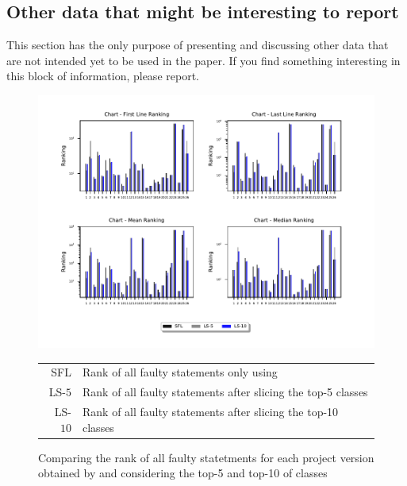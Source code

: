 \documentclass{article}
\begin{document}
\begin{appendices}
	\section{Other data that might be interesting to report}
	This section has the only purpose of presenting and discussing other data that 
	are not intended yet to be used in the paper. If you find something interesting 
	in this block of information, please report.

	\begin{figure}
		\centering
		\includegraphics[width=\textwidth]{figures/Chart_abs.pdf}
		\caption{Comparing the rank of all faulty statetments for each project version obtained by \sfl{} and \comb{} considering the top-5 and top-10 of classes}
		\begin{tabular}{r@{: }l}
			SFL & Rank of all faulty statements only using \sfl{}\\
			LS-$5$& Rank of all faulty statements after slicing the top-5 classes \\
			LS-$10$& Rank of all faulty statements after slicing the top-10 classes 
		\end{tabular}
		\label{fig:ranking}
	\end{figure}


\end{appendices}
\end{document}
